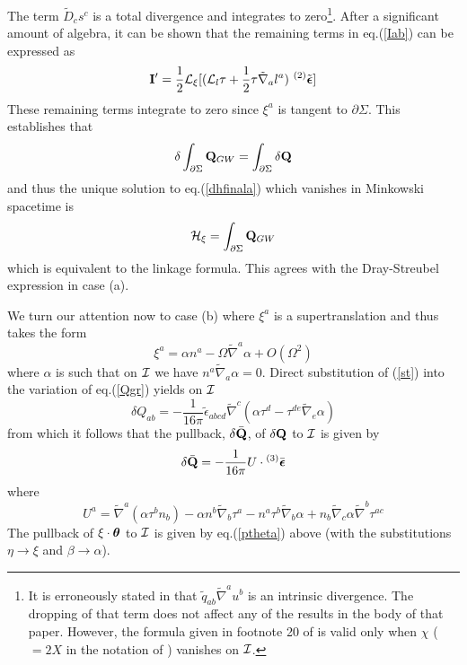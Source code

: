 The term $\tilde{D}_c s^c$ is a total divergence and integrates to
zero\footnote{It is erroneously stated in \cite{gw} that $\tilde{q}_{ab}
\tilde{\nabla}^a u^b$ is an intrinsic divergence. The dropping of that
term does not affect any of the results in the body of that
paper. However, the formula given in footnote 20 of \cite{gw} is valid
only when $\chi$ ($=2X$ in the notation of \cite{gw}) vanishes on
$\cal I$.}. After a significant amount of algebra, it can be shown
that the remaining terms in eq.(\ref{Iab}) can be expressed as
\begin{equation}
{\bf I}' = \frac{1}{2} {\cal L}_\xi [({\cal L}_l \tau
+\frac{1}{2} \tau \tilde{\nabla}_a l^a) \,\, {}^{(2)}
\tilde{\mbox{\boldmath $\epsilon$}}]
\label{Iab2}
\end{equation}
These remaining terms integrate to zero since $\xi^a$ is tangent to
$\partial \Sigma$. This establishes that
\begin{equation}
\delta \int_{\partial \Sigma} {\bf Q}_{GW} = \int_{\partial \Sigma}
\delta {\bf Q}
\label{QQGW}
\end{equation}
and thus the unique solution to eq.(\ref{dhfinala}) which vanishes in
Minkowski spacetime is
\begin{equation}
{\cal H}_\xi = \int_{\partial \Sigma} {\bf Q}_{GW}
\label{Ha}
\end{equation}
which is equivalent to the linkage formula. This agrees with the
Dray-Streubel expression in case (a).

We turn our attention now to case (b) where $\xi^a$ is a
supertranslation and thus takes the form \cite{gw}
\begin{equation}
\xi^a = \alpha n^a - \Omega \tilde{\nabla}^a \alpha + O(\Omega^2)
\label{st}
\end{equation}
where $\alpha$ is such that on $\cal I$ we have $n^a \tilde{\nabla}_a
\alpha = 0$. Direct substitution of (\ref{st}) into the variation of
eq.(\ref{Qgr}) yields on $\cal I$ \cite{i}
\begin{equation}
\delta Q_{ab} = - \frac{1}{16 \pi} \tilde{\epsilon}_{abcd}
\tilde{\nabla}^c (\alpha \tau^d - \tau^{de} \tilde{\nabla}_e \alpha) 
\label{dQb}
\end{equation}
from which it follows that the pullback, $\delta \bar{\bf Q}$, of
$\delta {\bf Q}$ to $\cal I$ is given by
\begin{equation}
\delta \bar{\bf Q} = - \frac{1}{16 \pi} U \cdot
{}^{(3)} \bar{\mbox{\boldmath $\epsilon$}}
\label{pdQb}
\end{equation}
where
\begin{equation}
U^a = \tilde{\nabla}^a (\alpha \tau^b n_b) - \alpha n^b
\tilde{\nabla}_b \tau^a - n^a \tau^b \tilde{\nabla}_b \alpha +
n_b \tilde{\nabla}_c \alpha \tilde{\nabla}^b \tau^{ac}
\label{U}
\end{equation}
The pullback of $\xi \cdot {\mbox{\boldmath $\theta$}}$ to $\cal I$ is
given by eq.(\ref{ptheta}) above (with the substitutions $\eta
\rightarrow \xi$ and $\beta \rightarrow \alpha$).

